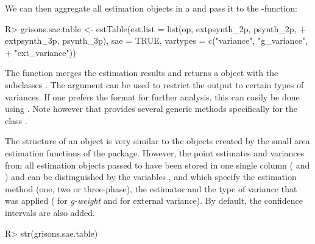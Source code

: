 We can then aggregate all estimation objects in a  and pass it to the -function:

\begin{small}
\begin{Schunk}
\begin{Sinput}
R> grisons.sae.table <- estTable(est.list = list(op, extpsynth_2p, psynth_2p,
+    extpsynth_3p, psynth_3p), sae = TRUE, vartypes = c("variance", "g_variance", 
+    "ext_variance"))
\end{Sinput}
\end{Schunk}
\end{small}

The function merges the estimation results and returns a  object with the subclasses . The  argument can be used to restrict the  output to certain types of variances. If one prefers the  format for further analysis, this can easily be done using . Note however that  provides several  generic methods specifically for the class .

The structure of an  object is very similar to the objects created by the small area estimation functions of the package. However, the point estimates and variances from all estimation objects passed to  have been stored in one single column ( and ) and can be distinguished by the variables ,  and  which specify the estimation method (one, two or three-phase), the estimator and the type of variance that was applied ( for \textit{g-weight} and  for external variance). By default, the confidence intervals are also added.

\begin{small}
\begin{Schunk}
\begin{Sinput}
R> str(grisons.sae.table)
\end{Sinput}
\end{Schunk}
\end{small}

